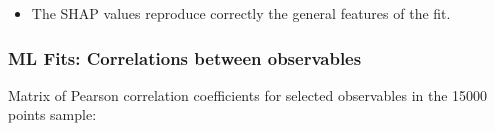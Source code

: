 \documentclass[mathserif, 10pt, dvipsnames]{beamer}
\begin{document}
\begin{frame}
\begin{center}
    \end{center}
\begin{itemize}
    \item The SHAP values reproduce correctly the
          general features of the fit.
\end{itemize}

\end{frame}

\begin{frame}\frametitle{ML Fits: Correlations between observables}
Matrix of Pearson correlation coefficients for selected observables in the 15000 points sample:
    \begin{columns}[onlytextwidth]
        \begin{column}{0.6\textwidth}


\end{column}
\end{columns}
\end{frame}
\end{document}
